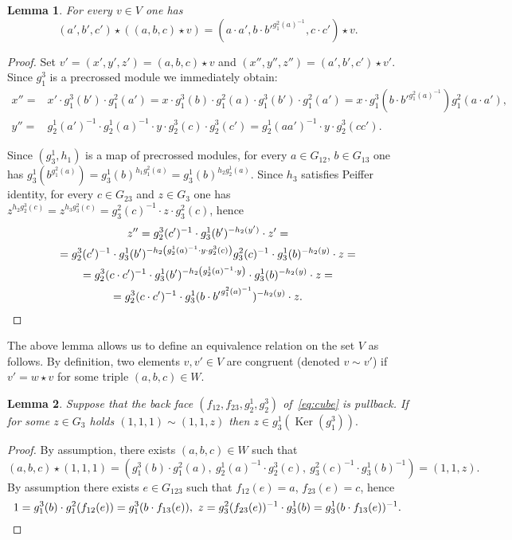 \documentclass[oneside, 10pt]{amsart}
\DeclareMathOperator{\Ker}{Ker}
\numberwithin{equation}{section}
\newtheorem{lemma}{Lemma}
\numberwithin{lemma}{section}
\theoremstyle{definition}
\theoremstyle{remark}
\begin{document}
\begin{lemma} For every $v \in V$ one has 
 \begin{equation*}(a', b', c') \star \left( (a, b, c) \star v \right) = (a \cdot a', b \cdot {b'}^{g_1^2(a)^{-1}}, c \cdot c') \star v.\end{equation*}
\end{lemma}
\begin{proof}
Set $v'=(x', y', z') = (a, b, c) \star v$ and $(x'', y'', z'') = (a', b', c') \star v'$.
Since $g_1^3$ is a precrossed module we immediately obtain:
\begin{align*} 
 x'' =& x' \cdot g_1^3(b') \cdot g_1^2(a') = x \cdot g_1^3(b) \cdot g_1^2(a) \cdot g_1^3(b') \cdot g_1^2(a') = x \cdot g_1^3(b \cdot b'^{g_1^2(a)^{-1}}) g_1^2(a \cdot a'),\\
 y'' =& g_2^1(a')^{-1} \cdot g_2^1(a)^{-1} \cdot y \cdot g_2^3(c) \cdot g_2^3(c') = g_2^1(aa')^{-1} \cdot y \cdot g_2^3(cc'). \end{align*}

Since $(g_3^1, h_1)$ is a map of precrossed modules, for every $a \in G_{12}$, $b \in G_{13}$ one has $g_3^1(b^{g_1^2(a)}) = g_3^1(b)^{h_1 g_1^2(a)} = g_3^1(b)^{h_2g_2^1(a)}$.
Since $h_3$ satisfies Peiffer identity, for every $c \in G_{23}$ and $z \in G_3$ one has $z ^{h_2 g_2^3(c)} = z^{ h_3 g_3^2(c)} = g_3^2(c)^{-1} \cdot z \cdot g_3^2(c)$, hence
\begin{multline*}
  z'' = g_2^3(c')^{-1} \cdot g_3^1(b')^{-h_2(y')} \cdot z' = \\ 
  = g_2^3(c')^{-1} \cdot g_3^1(b')^{- h_2 \left( g_2^1(a)^{-1} \cdot y \cdot g_2^3(c) \right)} g_3^2(c)^{-1} \cdot g_3^1(b)^{-h_2(y)} \cdot z = \\
  = g_2^3(c \cdot c')^{-1} \cdot g_3^1(b')^{- h_2 \left( g_2^1(a)^{-1} \cdot y \right)} \cdot g_3^1(b)^{-h_2(y)} \cdot z = \\
  = g_2^3(c \cdot c')^{-1} \cdot g_3^1(b \cdot {b'} ^ {g_1^2(a)^{-1}})^{- h_2 \left( y \right)} \cdot z. \qedhere
\end{multline*}
\end{proof}

The above lemma allows us to define an equivalence relation on the set $V$ as follows.
By definition, two elements $v, v' \in V$ are congruent (denoted $v \sim v'$)
 if $v' = w \star v$ for some triple $(a, b, c) \in W$.
 
\begin{lemma} Suppose that the back face $(f_{12}, f_{23}, g_2^1, g_2^3)$ of~\eqref{eq:cube} is pullback.
If for some $z\in G_3$ holds $(1, 1, 1)\sim (1, 1, z)$ then $z \in g_3^1(\Ker(g_1^3)).$ \end{lemma}
\begin{proof} By assumption, there exists $(a, b, c)\in W$ such that
 \[ (a, b, c) \star (1, 1, 1) = ( g_1^3(b) \cdot g_1^2(a),\ g_2^1(a)^{-1} \cdot g_2^3(c),\ g_3^2(c)^{-1} \cdot g_3^1(b)^{-1}) = (1,1,z). \]
 By assumption there exists $e \in G_{123}$ such that $f_{12}(e) = a$, $f_{23}(e) = c$, hence
 \[ 1 = g_1^3(b) \cdot g_1^2(f_{12}(e)) = g_1^3(b \cdot f_{13}(e)),\ z = g_3^2(f_{23}(e))^{-1} \cdot g_3^1(b) = g_3^1(b \cdot f_{13}(e))^{-1}. \qedhere\] \end{proof}
\end{document}
